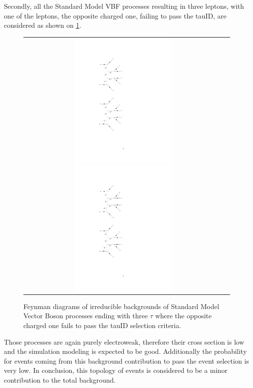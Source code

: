 Secondly, all the Standard Model VBF processes resulting in three leptons, with one of the leptons, the opposite charged one, failing to pass the tauID, are considered as shown on \ref{fig:background_SMVBFZ0Wmiss}.

\begin{figure}[tbh!]
	\centering
	\begin{tabular}{cc}
		\includegraphics[width=0.50\textwidth]{diagrams/pics/background_SMVBFZ0Wmissminus.pdf}
		\includegraphics[width=0.50\textwidth]{diagrams/pics/background_SMVBFZ0Wmissplus.pdf} 		
	\end{tabular}
	\caption{Feynman diagrams of irreducible backgrounds of Standard Model Vector Boson  processes ending with three $\tau$ where the opposite charged one fails to pass the tauID selection criteria. }
	\label{fig:background_SMVBFZ0Wmiss}
\end{figure}

Those processes are again purely electroweak, therefore their cross section is low and the simulation modeling is expected to be good. Additionally the probability for events coming from this background contribution to pass the event selection is very low. In conclusion, this topology of events is considered to be a minor contribution to the total background.  


